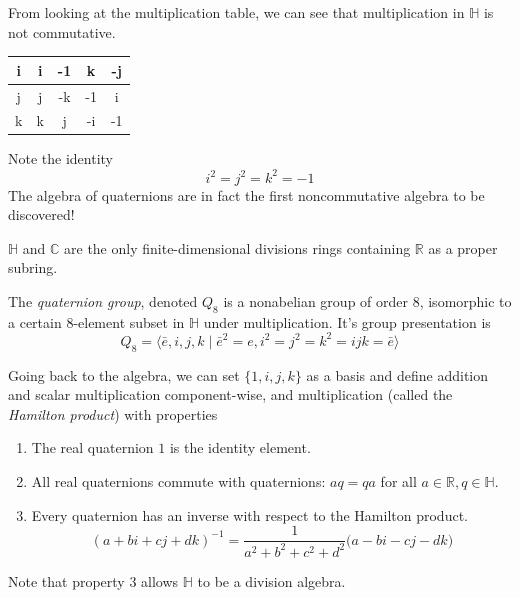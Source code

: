 \documentclass{article}
\begin{document}
    From looking at the multiplication table, we can see that multiplication in $\mathbb{H}$ is not commutative. 
    \begin{center}
      \begin{tabular}{|c|c|c|c|c|}
      \hline
      i & i & -1 & k & -j \\ 
      \hline
      j & j & -k & -1 & i \\ 
      \hline
      k & k & j & -i & -1 \\ 
      \hline
      \end{tabular}
    \end{center}
    Note the identity 
    \begin{equation}
      i^2 = j^2 = k^2 = -1
    \end{equation}
    The algebra of quaternions are in fact the first noncommutative algebra to be discovered! 

    \begin{proposition}
      $\mathbb{H}$ and $\mathbb{C}$ are the only finite-dimensional divisions rings containing $\mathbb{R}$ as a proper subring. 
    \end{proposition}

    \begin{definition}
      The \textit{quaternion group}, denoted $Q_8$ is a nonabelian group of order $8$, isomorphic to a certain $8$-element subset in $\mathbb{H}$ under multiplication. It's group presentation is 
      \begin{equation}
        Q_8 = \big\langle \bar{e}, i, j, k \;|\; \bar{e}^2 = e, i^2 = j^2 = k^2 = ijk = \bar{e} \big\rangle
      \end{equation}
    \end{definition}

    Going back to the algebra, we can set $\{1, i, j, k\}$ as a basis and define addition and scalar multiplication component-wise, and multiplication (called the \textit{Hamilton product}) with properties
    \begin{enumerate}
      \item The real quaternion $1$ is the identity element. 
      \item All real quaternions commute with quaternions: $a q = q a$ for all $a \in \mathbb{R}, q \in \mathbb{H}$. 
      \item Every quaternion has an inverse with respect to the Hamilton product. 
        \begin{equation}
          (a + bi + cj + dk)^{-1} = \frac{1}{a^2 + b^2 + c^2 + d^2} \big( a - bi - cj - dk\big)
        \end{equation}
    \end{enumerate}
    Note that property 3 allows $\mathbb{H}$ to be a division algebra. 
\end{document}
